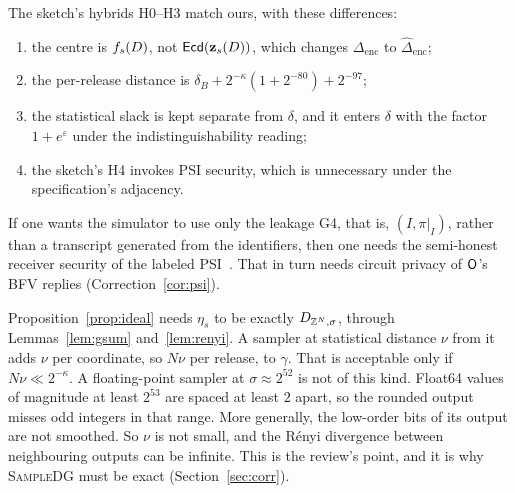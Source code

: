 \begin{remark}
The sketch's hybrids H0--H3 match ours, with these differences:
\begin{enumerate}[nosep,label=(\roman*)]
  \item the centre is $f_s(D)$, not $\mathsf{Ecd}(\mathbf z_s(D))$, which changes $\Delta_{\mathrm{enc}}$ to $\widehat\Delta_{\mathrm{enc}}$;
  \item the per-release distance is $\delta_B+2^{-\kappa}(1+2^{-80})+2^{-97}$;
  \item the statistical slack is kept separate from $\delta$, and it enters $\delta$ with the factor $1+e^\varepsilon$ under the indistinguishability reading;
  \item the sketch's H4 invokes PSI security, which is unnecessary under the specification's adjacency.
\end{enumerate}
If one wants the simulator to use only the leakage G4, that is, $(I,\pi|_I)$, rather than a transcript generated from the identifiers, then one needs the semi-honest receiver security of the labeled PSI~\cite{CHLR18}. That in turn needs circuit privacy of $\mathsf{O}$'s BFV replies (Correction~\ref{cor:psi}).
\end{remark}

\begin{remark}
Proposition~\ref{prop:ideal} needs $\eta_s$ to be exactly $D_{\mathbb{Z}^N,\sigma}$, through Lemmas~\ref{lem:gsum} and~\ref{lem:renyi}. A sampler at statistical distance $\nu$ from it adds $\nu$ per coordinate, so $N\nu$ per release, to $\gamma$. That is acceptable only if $N\nu\ll2^{-\kappa}$. A floating-point sampler at $\sigma\approx2^{52}$ is not of this kind. Float64 values of magnitude at least $2^{53}$ are spaced at least $2$ apart, so the rounded output misses odd integers in that range. More generally, the low-order bits of its output are not smoothed. So $\nu$ is not small, and the R\'enyi divergence between neighbouring outputs can be infinite. This is the review's point, and it is why \textsc{SampleDG} must be exact (Section~\ref{sec:corr}).
\end{remark}
